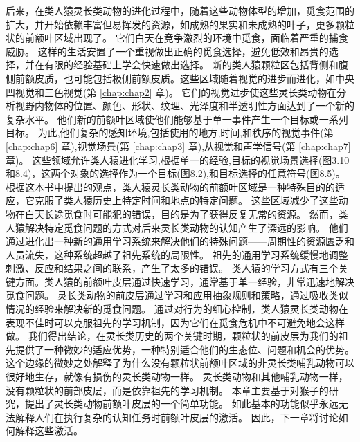 后来，在类人猿灵长类动物的进化过程中，随着这些动物体型的增加，觅食范围的扩大，并开始依赖丰富但易挥发的资源，如成熟的果实和未成熟的叶子，更多颗粒状的前额叶区域出现了。
它们白天在竞争激烈的环境中觅食，面临着严重的捕食威胁。
这样的生活安置了一个重视做出正确的觅食选择，避免低效和昂贵的选择，并在有限的经验基础上学会快速做出选择。
新的类人猿颗粒区包括背侧和腹侧前额皮质，也可能包括极侧前额皮质。这些区域随着视觉的进步而进化，如中央凹视觉和三色视觉(第 \ref{chap:chap2} 章)。
它们的视觉进步使这些灵长类动物在分析视野内物体的位置、颜色、形状、纹理、光泽度和半透明性方面达到了一个新的复杂水平。
他们新的前额叶区域使他们能够基于单一事件产生一个目标或一系列目标。
为此,他们复杂的感知环境,包括使用的地方,时间,和秩序的视觉事件(第 \ref{chap:chap6} 章),视觉场景(第 \ref{chap:chap3} 章),从视觉和声学信号(第 \ref{chap:chap7} 章)。
这些领域允许类人猿进化学习,根据单一的经验,目标的视觉场景选择(图3.10和8.4)，这两个对象的选择作为一个目标(图8.2),和目标选择的任意符号(图8.5)。
根据这本书中提出的观点，类人猿灵长类动物的前额叶区域是一种特殊目的的适应，它克服了类人猿历史上特定时间和地点的特定问题。
这些区域减少了这些动物在白天长途觅食时可能犯的错误，目的是为了获得反复无常的资源。
然而，类人猿解决特定觅食问题的方式对后来灵长类动物的认知产生了深远的影响。
他们通过进化出一种新的通用学习系统来解决他们的特殊问题——周期性的资源匮乏和人员流失，这种系统超越了祖先系统的局限性。
祖先的通用学习系统缓慢地调整刺激、反应和结果之间的联系，产生了太多的错误。
类人猿的学习方式有三个关键方面。类人猿的前额叶皮层通过快速学习，通常基于单一经验，非常迅速地解决觅食问题。
灵长类动物的前皮层通过学习和应用抽象规则和策略，通过吸收类似情况的经验来解决新的觅食问题。
通过对行为的细心控制，类人猿灵长类动物在表现不佳时可以克服祖先的学习机制，因为它们在觅食危机中不可避免地会这样做。
我们得出结论，在灵长类历史的两个关键时期，颗粒状的前皮层为我们的祖先提供了一种微妙的适应优势，一种特别适合他们的生态位、问题和机会的优势。
这个边缘的微妙之处解释了为什么没有颗粒状前额叶区域的非灵长类哺乳动物可以很好地生存，就像有损伤的灵长类动物一样。
灵长类动物和其他哺乳动物一样，没有颗粒状的前部皮层，而是依靠祖先的学习机制。
本章主要基于对猴子的研究，提出了灵长类动物前额叶皮层的一个简单功能。
如此基本的功能似乎永远无法解释人们在执行复杂的认知任务时前额叶皮层的激活。
因此，下一章将讨论如何解释这些激活。









